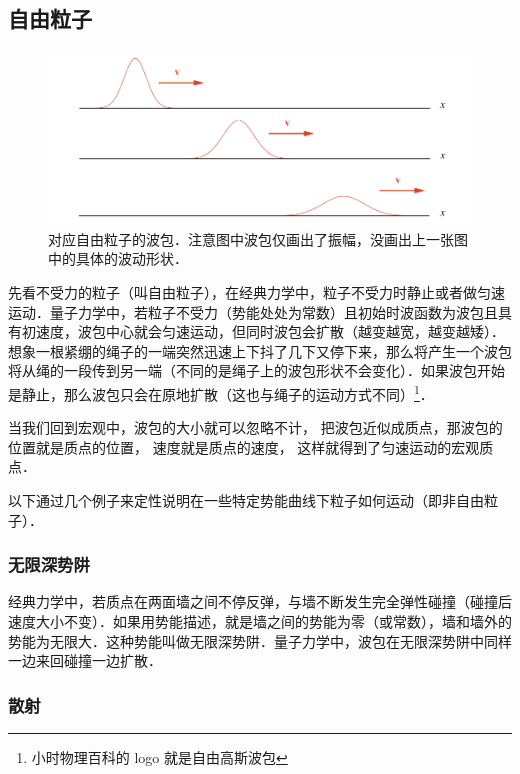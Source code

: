\subsection{自由粒子}

\begin{figure}[ht]
\centering
\includegraphics[width=14cm]{./figures/QM02.pdf}
\caption{对应自由粒子的波包．注意图中波包仅画出了振幅，没画出上一张图中的具体的波动形状．} \label{QM0_fig2}
\end{figure}

先看不受力的粒子（叫自由粒子），在经典力学中，粒子不受力时静止或者做匀速运动．量子力学中，若粒子不受力（势能处处为常数）且初始时波函数为波包且具有初速度，波包中心就会匀速运动，但同时波包会扩散（越变越宽，越变越矮）．想象一根紧绷的绳子的一端突然迅速上下抖了几下又停下来，那么将产生一个波包将从绳的一段传到另一端（不同的是绳子上的波包形状不会变化）．如果波包开始是静止，那么波包只会在原地扩散（这也与绳子的运动方式不同）\footnote{小时物理百科的 logo 就是自由高斯波包}．

当我们回到宏观中，波包的大小就可以忽略不计， 把波包近似成质点，那波包的位置就是质点的位置， 速度就是质点的速度， 这样就得到了匀速运动的宏观质点．

以下通过几个例子来定性说明在一些特定势能曲线下粒子如何运动（即非自由粒子）．

\subsubsection{无限深势阱}
经典力学中，若质点在两面墙之间不停反弹，与墙不断发生完全弹性碰撞（碰撞后速度大小不变）．如果用势能描述，就是墙之间的势能为零（或常数），墙和墙外的势能为无限大．这种势能叫做无限深势阱．量子力学中，波包在无限深势阱中同样一边来回碰撞一边扩散．

\subsubsection{散射}

